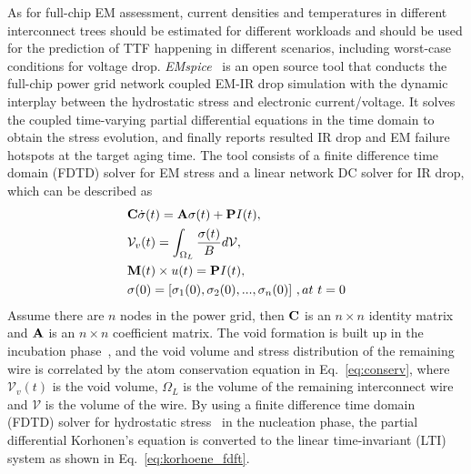 As for full-chip EM assessment, current densities and temperatures in different interconnect trees should be estimated for different workloads and should be used for the prediction of TTF happening in different scenarios, including worst-case conditions for voltage drop. {\it EMspice}~\cite{SunYu:TDMR'20,EMspiceSourceCode} is an open source tool that conducts the full-chip power grid network coupled EM-IR drop simulation with the dynamic interplay between the hydrostatic stress and electronic current/voltage. It solves the coupled time-varying partial differential equations in the time domain to obtain the stress evolution, and finally reports resulted IR drop and EM failure hotspots at the target aging time.  The tool consists of a finite difference time domain (FDTD) solver for EM stress and a linear network DC solver for IR drop, which can be described as
\begin{eqnarray}
& {\bf C}\dot{\sigma}(t)  ={\bf A}\sigma(t)+{\bf P}I(t), \label{eq:korhoene_fdft}\\
& \mathcal{V}_v(t)  = \int_{\Omega_L}\frac{\sigma(t)}{B}d\mathcal{V},  \label{eq:conserv}\\ 
&  {\bf M}(t) \times u(t)  = {\bf P} I(t), \label{eq:mna}\\
& {\bf \sigma}(0)  = [\sigma_1(0), \sigma_2(0), ..., \sigma_n(0)] \,\, ,at \,\, t = 0 
\end{eqnarray}
Assume there are $n$ nodes in the power grid, then ${{\bf C}}$ is an $n \times n$ identity matrix and ${{\bf A}}$ is an $n \times n$ coefficient matrix. The void formation is built up in the incubation phase~\cite{TanAmrouch:2017int}, and the void volume and stress distribution of the remaining wire is correlated by the atom conservation equation in Eq.~\eqref{eq:conserv}, where $\mathcal{V}_v(t)$ is the void volume, $\Omega_L$ is the volume of the remaining interconnect wire and $\mathcal{V}$ is the volume of the wire. By using a finite difference time domain (FDTD) solver for hydrostatic stress~\cite{CookSun:TVLSI'18} in the nucleation phase, the partial differential Korhonen's equation is converted to the linear time-invariant (LTI) system as shown in Eq.~\eqref{eq:korhoene_fdft}.

